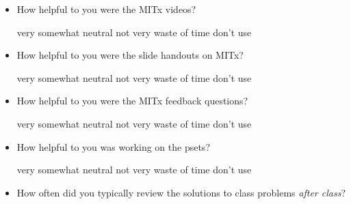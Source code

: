 \documentclass[handout]{mcs}
\begin{document}
\begin{itemize}
\begin{itemize}
\item How helpful to you were the MITx videos?

\begin{center}
very\hspace{0.3in} somewhat \hspace{0.3in} neutral\hspace{0.3in} not
very \hspace{0.3in} waste of time  \hspace{0.7in}don't use
\end{center}

\item How helpful to you were the slide handouts on MITx?

\begin{center}
very\hspace{0.3in} somewhat \hspace{0.3in} neutral\hspace{0.3in} not
very \hspace{0.3in} waste of time  \hspace{0.7in}don't use
\end{center}

\item How helpful to you were the MITx feedback questions?

\begin{center}
very\hspace{0.3in} somewhat \hspace{0.3in} neutral\hspace{0.3in} not
very \hspace{0.3in} waste of time  \hspace{0.7in}don't use
\end{center}

\item How helpful to you was working on the psets?
 
\begin{center}
very\hspace{0.3in} somewhat \hspace{0.3in} neutral\hspace{0.3in} not
very \hspace{0.3in} waste of time  \hspace{0.7in}don't use
\end{center}


\item How often did you typically review the solutions to class
  problems \emph{after class}?
 

\end{itemize}
\end{itemize}
\end{document}
